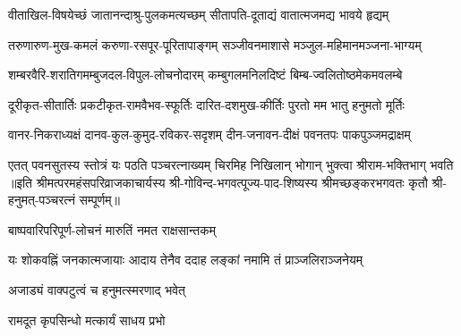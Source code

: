 
\twolineshloka
{वीताखिल-विषयेच्छं जातानन्दाश्रु-पुलकमत्यच्छम्}
{सीतापति-दूताद्यं वातात्मजमद्य भावये हृद्यम्}

\twolineshloka
{तरुणारुण-मुख-कमलं करुणा-रसपूर-पूरितापाङ्गम्}
{सञ्जीवनमाशासे मञ्जुल-महिमानमञ्जना-भाग्यम्}

\twolineshloka
{शम्बरवैरि-शरातिगमम्बुजदल-विपुल-लोचनोदारम्}
{कम्बुगलमनिलदिष्टं बिम्ब-ज्वलितोष्ठमेकमवलम्बे}

\twolineshloka
{दूरीकृत-सीतार्तिः प्रकटीकृत-रामवैभव-स्फूर्तिः}
{दारित-दशमुख-कीर्तिः पुरतो मम भातु हनुमतो मूर्तिः}

\twolineshloka
{वानर-निकराध्यक्षं दानव-कुल-कुमुद-रविकर-सदृशम्}
{दीन-जनावन-दीक्षं पवनतपः पाकपुञ्जमद्राक्षम्}

\twolineshloka
{एतत् पवनसुतस्य स्तोत्रं यः पठति पञ्चरत्नाख्यम्}
{चिरमिह निखिलान् भोगान् भुक्त्वा श्रीराम-भक्तिभाग् भवति}
॥इति श्रीमत्परमहंसपरिव्राजकाचार्यस्य श्री-गोविन्द-भगवत्पूज्य-पाद-शिष्यस्य
श्रीमच्छङ्करभगवतः कृतौ श्री-हनुमत्-पञ्चरत्नं सम्पूर्णम्॥

{बाष्पवारिपरिपूर्ण-लोचनं मारुतिं नमत राक्षसान्तकम्}

{यः शोकवह्निं जनकात्मजायाः}
{आदाय तेनैव ददाह लङ्कां}
{नमामि तं प्राञ्जलिराञ्जनेयम्}

{अजाड्यं वाक्पटुत्वं च हनुमत्स्मरणाद् भवेत्}

{रामदूत कृपसिन्धो मत्कार्यं साधय प्रभो}

